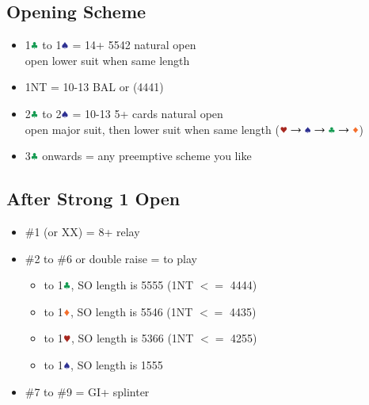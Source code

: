 \documentclass{article}
\newcommand*{\ccc}{\textcolor{ForestGreen}{\clubsuit}}
\newcommand*{\ddd}{\textcolor{Orange}{\vardiamondsuit}}
\newcommand*{\hhh}{\textcolor{Mahogany}{\varheartsuit}}
\newcommand*{\sss}{\textcolor{Blue}{\spadesuit}}
\begin{document}
\begin{multicols}{2}
\section{Opening Scheme}
\begin{itemize}
    \setlength\itemsep{-0.2em}
    \item 1$\ccc$ to 1$\sss$ = 14+ 5542 natural open \\
        open lower suit when same length
    \item 1NT = 10-13 BAL or (4441)
    \item 2$\ccc$ to 2$\sss$ = 10-13 5+ cards natural open \\
        open major suit, then lower suit when same length
        ($\hhh \rightarrow \sss \rightarrow \ccc \rightarrow \ddd$)
    \item 3$\ccc$ onwards = any preemptive scheme you like
\end{itemize}

\subsection{After Strong 1 Open}
\begin{itemize}
    \setlength\itemsep{-0.2em}
    \item \#1 (or XX) = 8+ relay
    \item \#2 to \#6 or double raise = to play
    \begin{itemize}
        \setlength\itemsep{-0.2em}
        \item to 1$\ccc$, SO length is 5555 (1NT $<=$ 4444)
        \item to 1$\ddd$, SO length is 5546 (1NT $<=$ 4435)
        \item to 1$\hhh$, SO length is 5366 (1NT $<=$ 4255)
        \item to 1$\sss$, SO length is 1555
    \end{itemize}
    \item \#7 to \#9 = GI+ splinter
\end{itemize}


\end{multicols}
\end{document}
